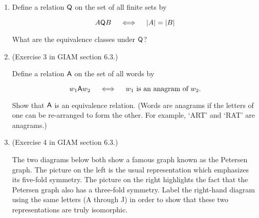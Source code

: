 \documentclass{amsart}
\begin{document}
\begin{enumerate}
\vfill

\newpage

\item Define a relation $\mbox{\textsf Q}$ on the set of all finite sets by

\[ A \mbox{\textsf Q} B \quad \iff \quad  |A| = |B| \]

What are the equivalence classes under $\mbox{\textsf Q}$?

\vfill

\item (Exercise 3 in GIAM section 6.3.)

Define a relation $\mbox{\textsf A}$ on the set of all words by

\[ w_1 \mbox{\textsf A} w_2 \quad \iff \quad w_1 \mbox{ is an anagram of } w_2. \]

\noindent Show that $\mbox{\textsf A}$ is an equivalence relation.  (Words are anagrams
if the letters of one can be re-arranged to form the other.  For example, `ART' and `RAT' are anagrams.)

\vfill

\newpage

\item (Exercise 4 in GIAM section 6.3.)

The two diagrams below both show a famous graph known as the 
Petersen graph.  The picture on the 
left is the usual representation which emphasizes its five-fold symmetry.  The picture on the right
highlights the fact that the Petersen graph also has a three-fold symmetry.  Label the right-hand diagram
using the same letters (A through J) in order to show that these two representations are truly isomorphic.

\vspace{.2in}

\rule{0pt}{0pt} \hspace{-.75in} 

\vspace{.2in}

\vfill

\end{enumerate}
\end{document}
